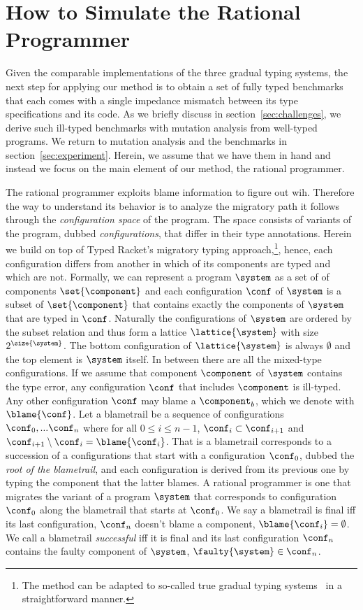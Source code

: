 \section{How to Simulate the Rational Programmer} \label{sec:ideas}

Given the comparable implementations of the three gradual typing systems,
the next step for applying our method is to obtain a set of fully
typed benchmarks that each comes with a single impedance mismatch between
its type specifications and its code. As we briefly discuss in
section~\ref{sec:challenges}, we derive such ill-typed benchmarks with
mutation analysis from well-typed programs.  We return to mutation
analysis and the benchmarks in section~\ref{sec:experiment}.  Herein,
we assume that we have them in hand and instead we focus on the
main element of our method, the rational programmer.  


The rational programmer exploits blame information to figure out wih. Therefore the way to understand its behavior 
is to analyze the migratory path it follows through the 
\emph{configuration space} of the program. The space
consists of variants of the program, dubbed \emph{configurations}, that 
differ in their type annotations. 
Herein we build on top of Typed Racket's migratory typing
approach,\footnote{The method can be adapted to so-called true gradual typing
systems~\cite{svcb-snapl-2015} in a straightforward manner.}, hence, each configuration differs from another
in which of its components are typed and which are not. Formally, we can
represent a program $\system$ as a set of of components
$\set{\component}$ and each configuration $\conf$ of $\system$ is a subset of 
$\set{\component}$
that contains exactly the components of  $\system$ that are typed in
$\conf$. Naturally the configurations of  $\system$ are ordered by the subset relation and
thus form a lattice $\lattice{\system}$ with size $2^{\size{\system}}$.
The bottom configuration of $\lattice{\system}$ is always $\emptyset$ and
the top element is $\system$ itself. In between there are all the
mixed-type configurations. If we assume that  component $\component$ of $\system$
contains the type error, any configuration $\conf$ that
includes $\component$ is ill-typed. Any other configuration $\conf$ may blame 
a $\component_b$, which we denote with $\blame{\conf}$. Let a blametrail
be a sequence of configurations $\conf_0,...\conf_n$ where 
for all $0 \leq i \leq n - 1$, $\conf_i \subset \conf_{i+1}$ and
$\conf_{i+1} \setminus \conf_i = \blame{\conf_i}$. That is a blametrail
corresponds to a succession of a configurations that start with a
configuration $\conf_0$, dubbed the \emph{root of the blametrail}, and 
each configuration is derived from its previous one by typing the
component that the latter blames. A rational programmer is one that
migrates the variant of a program $\system$ that corresponds to
configuration $\conf_0$ along the blametrail that starts at $\conf_0$.
We say a blametrail is final iff its last configuration, $\conf_n$
doesn't blame a component, $\blame{\conf_i} = \emptyset$. We call a
blametrail \emph{successful} iff it is final and its last configuration
$\conf_n$ contains the faulty component of $\system$, $\faulty{\system}
\in \conf_n$. 

